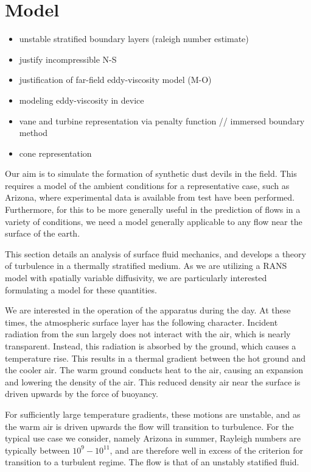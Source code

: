 \section{Model}

\begin{itemize}
\item unstable stratified boundary layers (raleigh number estimate)
\item justify incompressible N-S
\item justification of far-field eddy-viscosity model (M-O)
\item modeling eddy-viscosity in device 
\item vane and turbine representation via penalty function // immersed boundary method
\item cone representation
\end{itemize}

%
%

Our aim is to simulate the formation of synthetic dust devils in the
field. This requires a model of the ambient conditions for a
representative case, such as Arizona, where experimental data is
available from test have been performed. Furthermore, for this to be
more generally useful in the prediction of flows in a variety of
conditions, we need a model generally applicable to any flow near the
surface of the earth.  

This section details an analysis of surface fluid mechanics, and
develops a theory of turbulence in a thermally stratified medium. As we
are utilizing a RANS model with spatially variable diffusivity, we are
particularly interested formulating a model for these quantities. 

We are interested in the operation of the apparatus during the day. 
At these times, the atmospheric surface layer has the following character. 
Incident radiation from the sun largely does not interact with the
air, which is nearly transparent. Instead, this radiation is absorbed by
the ground, which causes a temperature rise. This results in a thermal
gradient between the hot ground and the cooler air. The warm ground
conducts heat to the air, causing an expansion and lowering the density
of the air. This reduced density air near the surface is driven upwards
by the force of buoyancy.  

For sufficiently large temperature gradients, these motions are
unstable, and as the warm air is driven upwards the flow will transition
to turbulence. For the typical use case we consider, namely Arizona in summer, 
Rayleigh numbers are typically between $10^9 - 10^11$, and are therefore 
well in excess of the criterion for transition to a turbulent regime. The 
flow is that of an unstably statified fluid. 


